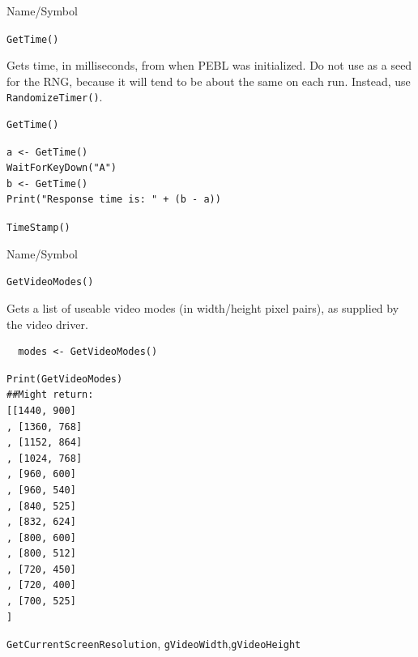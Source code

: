 \begin{desc}{Name/Symbol}
\item[Name/Symbol]	\verb+GetTime()+

\item[Description] Gets time, in milliseconds, from when PEBL was
  initialized.  Do not use as a seed for the RNG, because it will tend
  to be about the same on each run. Instead, use \verb+RandomizeTimer()+.

\item[Usage]
\begin{verbatim}
GetTime()
\end{verbatim}

\item[Example]
\begin{verbatim}
a <- GetTime()
WaitForKeyDown("A")
b <- GetTime()
Print("Response time is: " + (b - a))
\end{verbatim}

\item[See Also]	\verb+TimeStamp()+
\end{desc}


\begin{desc}{Name/Symbol}
\item[Name/Symbol]	\verb+GetVideoModes()+

\item[Description] Gets a list of useable video modes (in width/height pixel pairs), as supplied by the video driver.

\item[Usage]
\begin{verbatim}
  modes <- GetVideoModes()
\end{verbatim}

\item[Example]
\begin{verbatim}
Print(GetVideoModes)
##Might return:
[[1440, 900]
, [1360, 768]
, [1152, 864]
, [1024, 768]
, [960, 600]
, [960, 540]
, [840, 525]
, [832, 624]
, [800, 600]
, [800, 512]
, [720, 450]
, [720, 400]
, [700, 525]
]
\end{verbatim}

\item[See Also]	
\verb+GetCurrentScreenResolution+, \verb+gVideoWidth+,\verb+gVideoHeight+
\end{desc}


